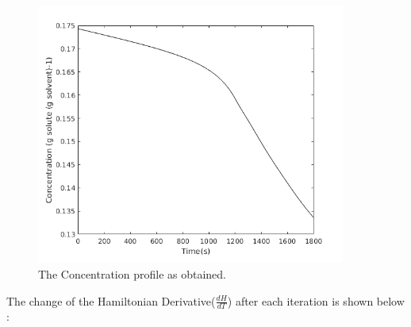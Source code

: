 \begin{figure}[h!] 

\begin{center}
\includegraphics[width=4in]{Dconc.png}
\end{center}
\caption{The Concentration profile as obtained.}
\end{figure}
\clearpage
The change of the Hamiltonian Derivative($\frac{dH}{dT}$) after each iteration is shown below : 
